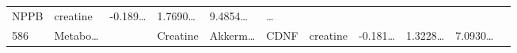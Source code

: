 \documentclass[
]{article}
\begin{document}
\begin{longtable}[]{@{}lllllllllll@{}}
\begin{minipage}[t]{0.07\columnwidth}
NPPB\strut
\end{minipage} & \begin{minipage}[t]{0.09\columnwidth}\raggedright
creatine\strut
\end{minipage} & \begin{minipage}[t]{0.07\columnwidth}\raggedright
-0.189\ldots{}\strut
\end{minipage} & \begin{minipage}[t]{0.07\columnwidth}\raggedright
1.7690\ldots{}\strut
\end{minipage} & \begin{minipage}[t]{0.07\columnwidth}\raggedright
9.4854\ldots{}\strut
\end{minipage} & \begin{minipage}[t]{0.03\columnwidth}\raggedright
\ldots{}\strut
\end{minipage}\tabularnewline
\begin{minipage}[t]{0.03\columnwidth}\raggedright
586\strut
\end{minipage} & \begin{minipage}[t]{0.07\columnwidth}\raggedright
Metabo\ldots{}\strut
\end{minipage} & \begin{minipage}[t]{0.07\columnwidth}\raggedright
\strut
\end{minipage} & \begin{minipage}[t]{0.09\columnwidth}\raggedright
Creatine\strut
\end{minipage} & \begin{minipage}[t]{0.07\columnwidth}\raggedright
Akkerm\ldots{}\strut
\end{minipage} & \begin{minipage}[t]{0.07\columnwidth}\raggedright
CDNF\strut
\end{minipage} & \begin{minipage}[t]{0.09\columnwidth}\raggedright
creatine\strut
\end{minipage} & \begin{minipage}[t]{0.07\columnwidth}\raggedright
-0.181\ldots{}\strut
\end{minipage} & \begin{minipage}[t]{0.07\columnwidth}\raggedright
1.3228\ldots{}\strut
\end{minipage} & \begin{minipage}[t]{0.07\columnwidth}\raggedright
7.0930\ldots{}\strut
\end{minipage} & \begin{minipage}[t]{0.03\columnwidth}\raggedright

\end{minipage}
\end{longtable}
\end{document}
